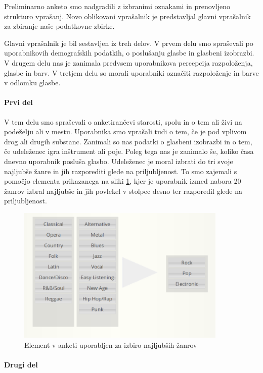 \documentclass[a4paper, 12pt]{book}
\begin{document}
{Preliminarno anketo smo nadgradili z izbranimi oznakami in prenovljeno strukturo vprašanj. Novo oblikovani vprašalnik je predstavljal glavni vprašalnik za zbiranje naše podatkovne zbirke.

Glavni vprašalnik je bil sestavljen iz treh delov. V prvem delu smo spraševali po uporabnikovih demografskih podatkih, o poslušanju glasbe in glasbeni izobrazbi. V drugem delu nas je zanimala predvsem uporabnikova percepcija razpoloženja, glasbe in barv. V tretjem delu so morali uporabniki označiti razpoloženje in barve v odlomku glasbe. 

\paragraph{Prvi del}

V tem delu smo spraševali o anketirančevi starosti, spolu in o tem ali živi na podeželju ali v mestu. Uporabnika smo vprašali tudi o tem, če je pod vplivom drog ali drugih substanc. Zanimali so nas podatki o glasbeni izobrazbi in o tem, če udeleženec igra inštrument ali poje. Poleg tega nas je zanimalo še, koliko časa dnevno uporabnik posluša glasbo. Udeleženec je moral izbrati do tri svoje najljubše žanre in jih razporediti glede na priljubljenost. To smo zajemali s pomočjo elementa prikazanega na sliki \ref{genresel}, kjer je uporabnik izmed nabora 20 žanrov izbral najljubše in jih povlekel v stolpec desno ter razporedil glede na priljubljenost. 

\begin{figure}[h!t]
\centering
\includegraphics[width=10cm]{genresel.png}

\caption{Element v anketi uporabljen za izbiro najljubših žanrov}
\label{genresel}
\end{figure}

\paragraph{Drugi del}
\label{ank2del}

}
\end{document}

